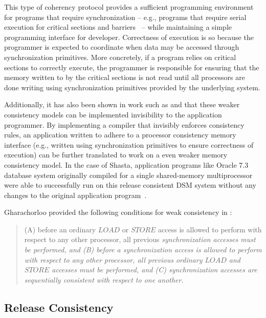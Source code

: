 \documentclass[10pt,conference]{IEEEtran}
\begin{document}
This type of coherency protocol provides a sufficient programming environment for programs that require synchronization -- e.g., programs that require serial execution for critical sections and barriers~\cite{Steinke:2004:UTS:1017460.1017464} -- while maintaining a simple programming interface for developer.  Correctness of execution is so because the programmer is expected to coordinate when data may be accessed through synchronization primitives.  More concretely, if a program relies on critical sections to correctly execute, the programmer is responsible for ensuring that the memory written to by the critical sections is not read until all processors are done writing using synchronization primitives provided by the underlying system.

Additionally, it has also been shown in work such as \cite{Scheurich:1987:CMO:30350.30377} and \cite{Scales:1997:TTE:268998.266673} that these weaker consistency models can be implemented invisibility to the application programmer.  By implementing a compiler that invisibly enforces consistency rules, an application written to adhere to a processor consistency memory interface (e.g., written using synchronization primitives to ensure correctness of execution) can be further translated to work on a even weaker memory consistency model.  In the case of Shasta, application programs like Oracle 7.3 database system originally compiled for a single shared-memory multiprocessor were able to successfully run on this release consistent DSM system without any changes to the original application program~\cite{Scales:1997:TTE:268998.266673}.

Gharachorloo provided the following conditions for weak consistency in \cite{Gharachorloo:1990:MCE:325164.325102}:

\begin{quote}
\begin{condition}
(A) before an ordinary $LOAD$ or $STORE$ access is allowed to perform with respect to any other processor, all previous \em synchronization \em accesses must be performed, and (B) before a \em synchronization \em access is allowed to perform with respect to any other processor, all previous ordinary $LOAD$ and $STORE$ accesses must be performed, and (C) \em synchronization \em accesses are sequentially consistent with respect to one another.
\end{condition}
\end{quote}

\subsection{Release Consistency}
\label{release-consistency}
\end{document}
